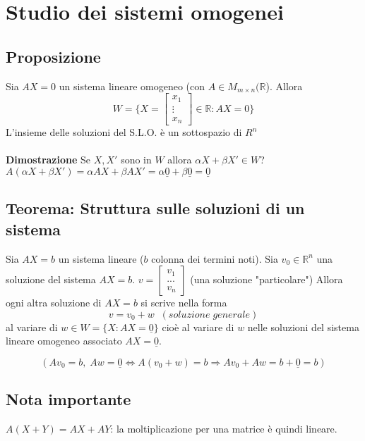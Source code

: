 \section{Studio dei sistemi omogenei}

\subsection{Proposizione}
Sia $AX=0$ un sistema lineare omogeneo (con $A\in M_{m\times n}(\mathbb{R}$). Allora 
\[W=\{X=\begin{bmatrix}x_1\\\vdots\\x_n\end{bmatrix}\in\mathbb{R}:AX=0\}\]
L'insieme delle soluzioni del S.L.O. è un sottospazio di $R^n$
\\
\\\textbf{Dimostrazione}
Se $X, X'$ sono in $W$ allora $\alpha X+\beta X'\in W$?
$A(\alpha X+\beta X')=\alpha AX+\beta AX'=\alpha \underline{0}+\beta \underline{0}=\underline{0}$
\subsection{Teorema: Struttura sulle soluzioni di un sistema}
Sia $AX=b$ un sistema lineare ($b$ colonna dei termini noti). 
Sia $v_0\in\mathbb{R}^n$ una soluzione del sistema $AX=b$.
$v=\begin{bmatrix}v_1\\...\\v_n\end{bmatrix}$ (una soluzione "particolare")
Allora ogni altra soluzione di $AX=b$ si scrive nella forma 
\[v=v_0+w\;\;(soluzione\;generale)\]
al variare di $w\in W=\{X:AX=\underline{0}\}$ cioè al variare di $w$ nelle soluzioni del sistema lineare omogeneo associato $AX=\underline{0}$.

\[(Av_0=b,\;Aw=\underline{0}\Leftrightarrow A(v_0+w)=b\Rightarrow Av_0+Aw=b+\underline{0}=b)\]

\subsection{Nota importante}
$A(X+Y)=AX+AY$: la moltiplicazione per una matrice è quindi lineare.